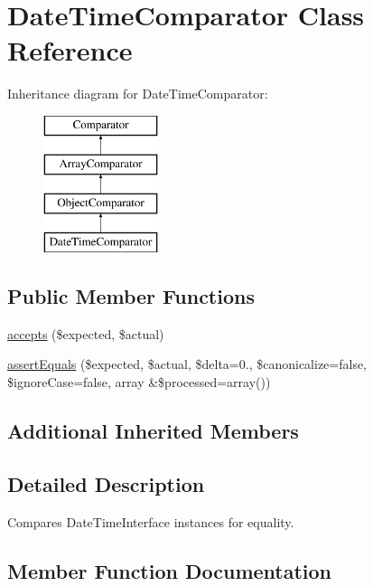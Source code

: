 \hypertarget{class_sebastian_bergmann_1_1_comparator_1_1_date_time_comparator}{}\section{Date\+Time\+Comparator Class Reference}
\label{class_sebastian_bergmann_1_1_comparator_1_1_date_time_comparator}
Inheritance diagram for Date\+Time\+Comparator\+:\begin{figure}[H]
\begin{center}
\leavevmode
\includegraphics[height=4.000000cm]{class_sebastian_bergmann_1_1_comparator_1_1_date_time_comparator}
\end{center}
\end{figure}
\subsection*{Public Member Functions}
\begin{DoxyCompactItemize}
\item 
\mbox{\hyperlink{class_sebastian_bergmann_1_1_comparator_1_1_date_time_comparator_ae9bdf0cba02ce3470169280656cdeb84}{accepts}} (\$expected, \$actual)
\item 
\mbox{\hyperlink{class_sebastian_bergmann_1_1_comparator_1_1_date_time_comparator_a85a7369896910cf1d55e31d477c29f1e}{assert\+Equals}} (\$expected, \$actual, \$delta=0., \$canonicalize=false, \$ignore\+Case=false, array \&\$processed=array())
\end{DoxyCompactItemize}
\subsection*{Additional Inherited Members}


\subsection{Detailed Description}
Compares Date\+Time\+Interface instances for equality. 

\subsection{Member Function Documentation}
\mbox{\label{class_sebastian_bergmann_1_1_comparator_1_1_date_time_comparator_ae9bdf0cba02ce3470169280656cdeb84}} 
